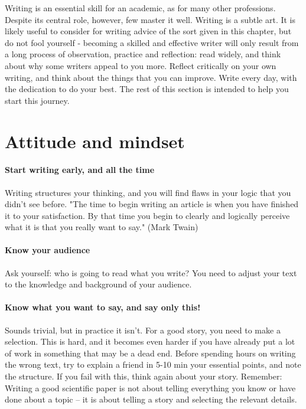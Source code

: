 \documentclass{tufte-book}
\begin{document}
Writing is an essential skill for an academic, as for many other professions.  Despite its central role, however, few master it well. Writing is a subtle art. It is likely useful to consider for writing advice of the sort given in this chapter, but do not fool yourself - becoming a skilled and effective writer will only result from a long process of observation, practice and reflection: read widely, and think about why some writers appeal to you more. Reflect critically on your own writing, and think about the things that you can improve. Write every day, with the dedication to do your best. The rest of this section is intended to help you start this journey.

\section{Attitude and mindset}

\paragraph{Start writing early, and all the time} Writing structures your thinking, and you will find flaws in your logic that you didn't see before. "The time to begin writing an article is when you have finished it to your satisfaction. By that time you begin to clearly and logically perceive what it is that you really want to say." (Mark Twain)


\paragraph{Know your audience} Ask yourself: who is going to read what you write?  You need to adjust your text to the knowledge and background of your audience.


\paragraph{Know what you want to say, and say only this!} Sounds trivial, but in practice it isn't. For a good story, you need to make a selection. This is hard, and it becomes even harder if you have already put a lot of work in something that may be a dead end. Before spending hours on writing the wrong text, try to explain a friend in 5-10 min your essential points, and note the structure. If you fail with this, think again about your story. Remember: Writing a good scientific paper is not about telling everything you know or have done about a topic -- it is about telling a story and selecting the relevant details.
\end{document}

